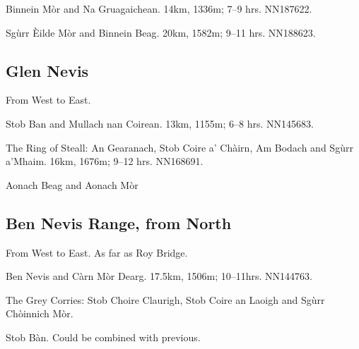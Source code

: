 \begin{munros}
\item\tick
Binnein Mòr and Na Gruagaichean.  14km, 1336m; 7--9 hrs.  NN187622.

\item\tick
Sgùrr Èilde Mòr and Binnein Beag.  20km, 1582m; 9--11 hrs.  NN188623.
\end{munros}


\subsection{Glen Nevis}

From West to East. 

\begin{munros}
\item\target\tick
Stob Ban  and Mullach nan Coirean.  13km, 1155m; 6--8 hrs. NN145683. 

\item\target\tick
The Ring of Steall: An Gearanach, Stob Coire a' Chàirn, Am Bodach and Sgùrr
a'Mhaim.  16km, 1676m; 9--12 hrs.  NN168691.

\item
Aonach Beag and Aonach Mòr
\end{munros}



\subsection{Ben Nevis Range, from North}

From West to East.  As far as Roy Bridge. 

\begin{munros}
\item\tick
Ben Nevis and Càrn Mòr Dearg.  17.5km, 1506m; 10--11hrs.  NN144763.

\item\target\tick
The Grey Corries: Stob Choire Claurigh, Stob Coire an Laoigh and Sgùrr
Chòinnich Mòr. 

\item
Stob Bàn.  Could be combined with previous. 
\end{munros}

